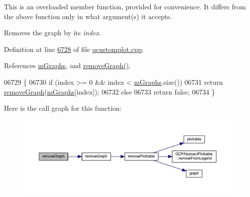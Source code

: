 This is an overloaded member function, provided for convenience. It differs from the above function only in what argument(s) it accepts.

Removes the graph by its {\itshape index}. 



Definition at line \hyperlink{a00115_source_l06728}{6728} of file \hyperlink{a00115_source}{qcustomplot.\+cpp}.



References \hyperlink{a00116_source_l02116}{m\+Graphs}, and \hyperlink{a00115_source_l06719}{remove\+Graph()}.


\begin{DoxyCode}
06729 \{
06730   \textcolor{keywordflow}{if} (index >= 0 && index < \hyperlink{a00116_a54ed2081d9366a6c2137bf9d9f7b8371}{mGraphs}.size())
06731     \textcolor{keywordflow}{return} \hyperlink{a00116_a903561be895fb6528a770d66ac5e6713}{removeGraph}(\hyperlink{a00116_a54ed2081d9366a6c2137bf9d9f7b8371}{mGraphs}[index]);
06732   \textcolor{keywordflow}{else}
06733     \textcolor{keywordflow}{return} \textcolor{keyword}{false};
06734 \}
\end{DoxyCode}


Here is the call graph for this function\+:
\nopagebreak
\begin{figure}[H]
\begin{center}
\leavevmode
\includegraphics[width=350pt]{d4/d3e/a00116_a9554b3d2d5b10c0f884bd4010b6c192c_cgraph}
\end{center}
\end{figure}


